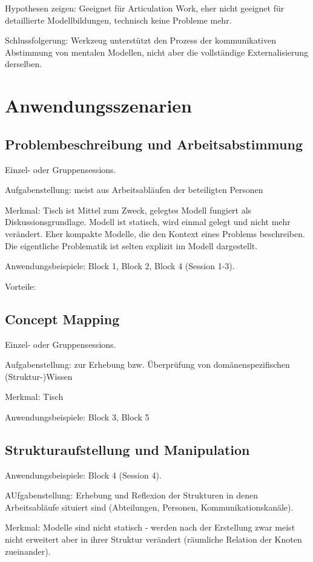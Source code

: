 Hypothesen zeigen: Geeignet für Articulation Work, eher nicht geeignet für detaillierte Modellbildungen, technisch keine Probleme mehr.

Schlussfolgerung: Werkzeug unterstützt den Prozess der kommunikativen Abstimmung von mentalen Modellen, nicht aber die vollständige Externalisierung derselben.

\section{Anwendungsszenarien} %
\label{sec:anwendungsszenarien}

\subsection{Problembeschreibung und Arbeitsabstimmung}

Einzel- oder Gruppensessions. 

Aufgabenstellung: meist aus Arbeitsabläufen der beteiligten Personen

Merkmal: Tisch ist Mittel zum Zweck, gelegtes Modell fungiert als Diskussionsgrundlage. Modell ist statisch, wird einmal gelegt und nicht mehr verändert. Eher kompakte Modelle, die den Kontext eines Problems beschreiben. Die eigentliche Problematik ist selten explizit im Modell dargestellt.

Anwendungsbeispiele: Block 1, Block 2, Block 4 (Session 1-3).

Vorteile:

\subsection{Concept Mapping}

Einzel- oder Gruppensessions. 

Aufgabenstellung: zur Erhebung bzw. Überprüfung von domänenspezifischen (Struktur-)Wissen

Merkmal: Tisch 

Anwendungsbeispiele: Block 3, Block 5

\subsection{Strukturaufstellung und Manipulation}

Anwendungsbeispiele: Block 4 (Session 4).

AUfgabenstellung: Erhebung und Reflexion der Strukturen in denen Arbeitsabläufe situiert sind (Abteilungen, Personen, Kommunikationskanäle).

Merkmal: Modelle sind nicht statisch - werden nach der Erstellung zwar meist nicht erweitert aber in ihrer Struktur verändert (räumliche Relation der Knoten zueinander). 

